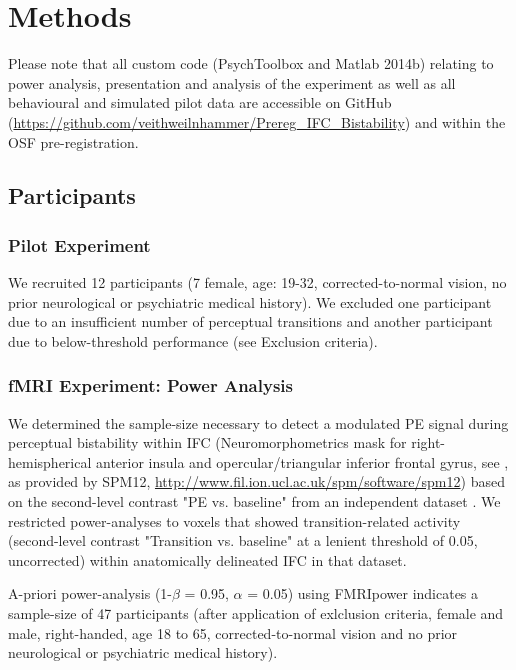 \documentclass[12pt]{article}
\begin{document}
\section{Methods}

Please note that all custom code (PsychToolbox and Matlab 2014b) relating to power analysis, presentation and analysis of the experiment as well as all behavioural and simulated pilot data are accessible on GitHub (\url{https://github.com/veithweilnhammer/Prereg_IFC_Bistability}) and within the OSF pre-registration. 

\subsection{Participants}

\subsubsection{Pilot Experiment}

We recruited 12 participants (7 female, age: 19-32, corrected-to-normal vision, no prior neurological or psychiatric medical history). We excluded one participant due to an insufficient number of perceptual transitions and another participant due to below-threshold performance (see Exclusion criteria).

\subsubsection{fMRI Experiment: Power Analysis}

We determined the sample-size necessary to detect a modulated PE signal during perceptual bistability within IFC (Neuromorphometrics mask for right-hemispherical anterior insula and opercular/triangular inferior frontal gyrus, see \cite{Brascamp2018}, as provided by SPM12, \url{http://www.fil.ion.ucl.ac.uk/spm/software/spm12}) based on the second-level contrast "PE vs. baseline" from an independent dataset \parencite{Weilnhammer2017}. We restricted power-analyses to voxels that showed transition-related activity (second-level contrast "Transition vs. baseline" at a lenient threshold of 0.05, uncorrected) within anatomically delineated IFC in that dataset. 

A-priori power-analysis (1-$\beta$ = 0.95, $\alpha$ = 0.05) using FMRIpower \parencite{Mumford2008} indicates a sample-size of 47 participants (after application of exlclusion criteria, female and male, right-handed, age 18 to 65, corrected-to-normal vision and no prior neurological or psychiatric medical history). 
\end{document}
